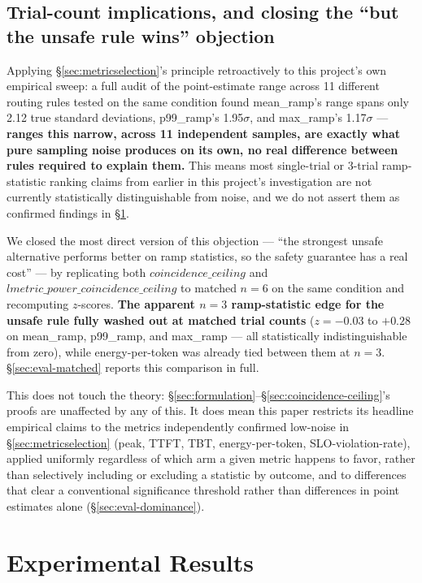 \documentclass[sigconf,review,anonymous]{acmart}
\begin{document}
\subsection{Trial-count implications, and closing the ``but the unsafe rule wins'' objection}
\label{sec:trialcount}

Applying \S\ref{sec:metricselection}'s principle retroactively to this project's own
empirical sweep: a full audit of the point-estimate range across 11 different routing rules
tested on the same condition found mean\_ramp's range spans only 2.12 true standard
deviations, p99\_ramp's 1.95$\sigma$, and max\_ramp's 1.17$\sigma$ --- \textbf{ranges this
narrow, across 11 independent samples, are exactly what pure sampling noise produces on its
own, no real difference between rules required to explain them.} This means most single-trial
or 3-trial ramp-statistic ranking claims from earlier in this project's investigation are not
currently statistically distinguishable from noise, and we do not assert them as confirmed
findings in \S\ref{sec:eval}.

We closed the most direct version of this objection --- ``the strongest unsafe alternative
performs better on ramp statistics, so the safety guarantee has a real cost'' --- by
replicating both $\mathit{coincidence\_ceiling}$ and
$\mathit{lmetric\_power\_coincidence\_ceiling}$ to matched $n{=}6$ on the same condition and
recomputing $z$-scores. \textbf{The apparent $n{=}3$ ramp-statistic edge for the unsafe rule
fully washed out at matched trial counts} ($z = -0.03$ to $+0.28$ on mean\_ramp, p99\_ramp,
and max\_ramp --- all statistically indistinguishable from zero), while energy-per-token was
already tied between them at $n{=}3$. \S\ref{sec:eval-matched} reports this comparison in
full.

This does not touch the theory: \S\ref{sec:formulation}--\S\ref{sec:coincidence-ceiling}'s
proofs are unaffected by any of this. It does mean this paper restricts its headline empirical
claims to the metrics independently confirmed low-noise in \S\ref{sec:metricselection} (peak,
TTFT, TBT, energy-per-token, SLO-violation-rate), applied uniformly regardless of which arm a
given metric happens to favor, rather than selectively including or excluding a statistic by
outcome, and to differences that clear a conventional significance threshold rather than
differences in point estimates alone (\S\ref{sec:eval-dominance}).

\vspace{-3pt}
\section{Experimental Results}
\label{sec:eval}
\end{document}
